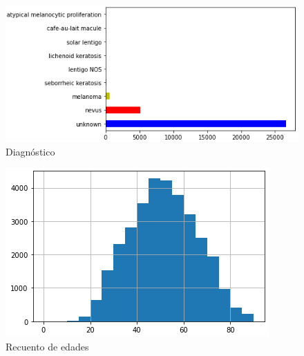\begin{figure}[htbp]
    \centering
    \textbf{}\par\medskip
    \includegraphics[scale=0.90]{figures/metadata/diagnosis_count.PNG}
    \caption{Diagnóstico}
\end{figure}

\begin{figure}[htbp]
    \centering
    \textbf{}\par\medskip
    \includegraphics[scale=0.90]{figures/metadata/age_count.PNG}
    \caption{Recuento de edades}
\end{figure}